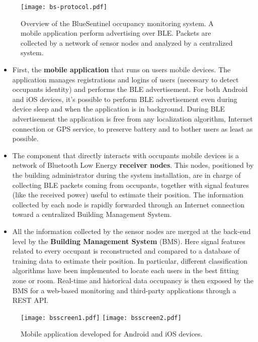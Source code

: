\begin{figure}[h!tb]
\centering
\texttt{[image: bs-protocol.pdf]}
\caption[Overview of the BlueSentinel occupancy monitoring system.]{Overview of the BlueSentinel occupancy monitoring system. A mobile application perform advertising over BLE. Packets are collected by a network of sensor nodes and analyzed by a centralized system.}
\label{fig:bs-protocol}
\end{figure}

\begin{itemize}
\item First, the \textbf{mobile application} that runs on users mobile devices. The application manages registrations and logins of users (necessary to detect occupants identity) and performs the BLE advertisement. For both Android and iOS devices, it's possible to perform BLE advertisement even during device sleep and when the application is in background.
During BLE advertisement the application is free from any localization algorithm, Internet connection or GPS service, to preserve battery and to bother users as least as possible.

\item The component that directly interacts with occupants mobile devices is a network of Bluetooth Low Energy \textbf{receiver nodes}. This nodes, positioned by the building administrator during the system installation, are in charge of collecting BLE packets coming from occupants, together with signal features (like the received power) useful to estimate their position. The information collected by each node is rapidly forwarded through an Internet connection toward a centralized Building Management System.

\item All the information collected by the sensor nodes are merged at the back-end level by the \textbf{Building Management System} (BMS). Here signal features related to every occupant is reconstructed and compared to a database of training data to estimate their position. In particular, different classification algorithms have been implemented to locate each users in the best fitting zone or room. Real-time and historical data occupancy is then exposed by the BMS for a web-based monitoring and third-party applications through a REST API.
\end{itemize}

\begin{figure*}
\center
{}
\center
  \texttt{[image: bsscreen1.pdf]}
\endminipage
{}
\center
  \texttt{[image: bsscreen2.pdf]}
\endminipage
  \caption{Mobile application developed for Android and iOS devices.}\label{fig:bsscreen}
\end{figure*}

